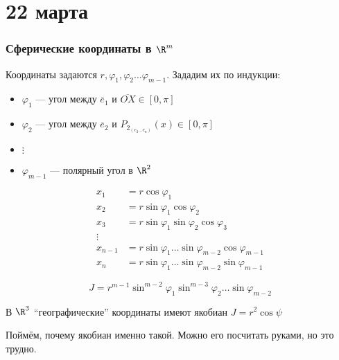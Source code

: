 \chapter{22 марта}

\subsection{Сферические координаты в \(\R^m\)}

Координаты задаются \(r, \varphi_1, \varphi_2 \dots \varphi_{m - 1}\). Зададим их по индукции:

\begin{itemize}
    \item \(\varphi_1\) --- угол между \(\overline e_1\) и \(\overline{OX}\in[0, \pi]\)
    \item \(\varphi_2\) --- угол между \(\overline e_2\) и \(P_{2_{(e_2 \dots e_n)}}(x)\in[0, \pi]\)
    \item \(\vdots\)
    \item \(\varphi_{m - 1}\) --- полярный угол в \(\R^2\)
\end{itemize}

\begin{align*}
    x_1       & = r \cos \varphi_1                                                 \\
    x_2       & = r \sin \varphi_1 \cos \varphi_2                                  \\
    x_3       & = r \sin \varphi_1 \sin \varphi_2 \cos \varphi_3                   \\
    \vdots                                                                         \\
    x_{n - 1} & = r \sin \varphi_1 \dots \sin \varphi_{m - 2} \cos \varphi_{m - 1} \\
    x_n       & = r \sin \varphi_1 \dots \sin \varphi_{m - 2} \sin \varphi_{m - 1}
\end{align*}

\[J = r^{m - 1} \sin^{m - 2}\varphi_1 \sin^{m - 3}\varphi_2 \dots \sin \varphi_{m - 2}\]

\begin{remark}
    В \(\R^3\) ``географические'' координаты имеют якобиан \(J = r^2 \cos \psi\)
\end{remark}

Поймём, почему якобиан именно такой. Можно его посчитать руками, но это трудно.

